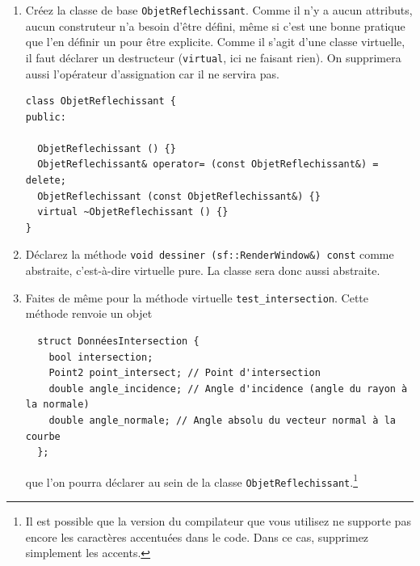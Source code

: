 \documentclass{book}
\newcommand{\inline}[1]{\texttt{#1}}
\begin{document}
\begin{enumerate}

  \item Créez la classe de base \texttt{ObjetReflechissant}. Comme il n'y a aucun attributs, aucun construteur n'a besoin d'être défini, même si c'est une bonne pratique que l'en définir un pour être explicite. Comme il s'agit d'une classe virtuelle, il faut déclarer un destructeur (\inline{virtual}, ici ne faisant rien). On supprimera aussi l'opérateur d'assignation car il ne servira pas.

\begin{correction}
\begin{verbatim}
class ObjetReflechissant {
public:
  
  ObjetReflechissant () {}
  ObjetReflechissant& operator= (const ObjetReflechissant&) = delete;
  ObjetReflechissant (const ObjetReflechissant&) {}
  virtual ~ObjetReflechissant () {}
}
\end{verbatim}
\end{correction}

  \item Déclarez la méthode \inline{void dessiner (sf::RenderWindow&) const} comme abstraite, c'est-à-dire virtuelle pure. La classe sera donc aussi abstraite.

  \item Faites de même pour la méthode virtuelle \inline{test_intersection}. Cette méthode renvoie un objet
  \begin{verbatim}
  struct DonnéesIntersection {
    bool intersection;
    Point2 point_intersect; // Point d'intersection
    double angle_incidence; // Angle d'incidence (angle du rayon à la normale)
    double angle_normale; // Angle absolu du vecteur normal à la courbe
  };
  \end{verbatim}
  que l'on pourra déclarer au sein de la classe \texttt{ObjetReflechissant}.\footnote{Il est possible que la version du compilateur que vous utilisez ne supporte pas encore les caractères accentuées dans le code. Dans ce cas, supprimez simplement les accents.}


\end{enumerate}
\end{document}
